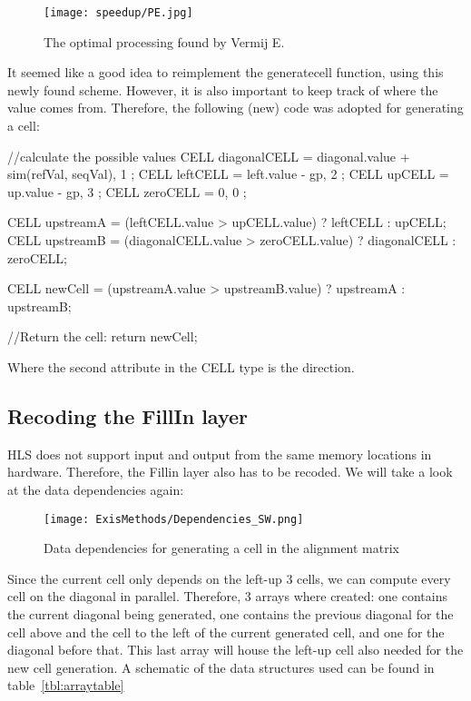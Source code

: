 \begin{figure}[H]
	\centering
	\texttt{[image: speedup/PE.jpg]}
	\caption{The optimal processing found by Vermij E.~\cite{Vermij}}
	\label{fig:PE}
\end{figure}

It seemed like a good idea to reimplement the generatecell function, using this newly found scheme. However, it is also important to keep track of where the value comes from. Therefore, the following (new) code was adopted for generating a cell:

\begin{lcverbatim}
//calculate the possible  values
CELL diagonalCELL = { diagonal.value + sim(refVal, seqVal), 1 };
CELL leftCELL = { left.value - gp, 2 };
CELL upCELL = { up.value - gp, 3 };
CELL zeroCELL = { 0, 0 };

CELL upstreamA = (leftCELL.value > upCELL.value) ? leftCELL : upCELL;
CELL upstreamB = (diagonalCELL.value > zeroCELL.value) ? 
diagonalCELL : zeroCELL;

CELL newCell = (upstreamA.value > upstreamB.value) ? upstreamA : upstreamB;

//Return the cell:
return newCell;
\end{lcverbatim}
Where the second attribute in the CELL type is the direction.

\subsection{Recoding the FillIn layer}

HLS does not support input and output from the same memory locations in hardware. Therefore, the Fillin layer also has to be recoded. We will take a look at the data dependencies again:

\begin{figure}[H]
	\centering
	\texttt{[image: ExisMethods/Dependencies\_SW.png]}
	\caption{Data dependencies for generating a cell in the alignment matrix}
	\label{fig:DatDep2}
\end{figure}

Since the current cell only depends on the left-up 3 cells, we can compute every cell on the diagonal in parallel. Therefore, 3 arrays where created: one contains the current diagonal being generated, one contains the previous diagonal for the cell above and the cell to the left of the current generated cell, and one for the diagonal before that. This last array will house the left-up cell also needed for the new cell generation. A schematic of the data structures used can be found in table~\ref{tbl:arraytable}

